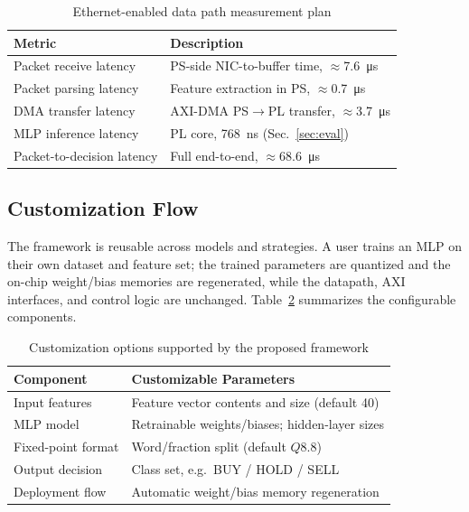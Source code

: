 \documentclass[final,5p,times,twocolumn]{elsarticle}
\begin{document}
\begin{table}[htbp]
\centering
\caption{Ethernet-enabled data path measurement plan}
\label{tab:ethernet_measurement_plan}
\begin{tabular}{p{3.2cm} p{4.2cm}}
\toprule
Metric & Description \\
\midrule
Packet receive latency & PS-side NIC-to-buffer time, $\approx$\SI{7.6}{\micro\second} \\
Packet parsing latency & Feature extraction in PS, $\approx$\SI{0.7}{\micro\second} \\
DMA transfer latency & AXI-DMA PS$\rightarrow$PL transfer, $\approx$\SI{3.7}{\micro\second} \\
MLP inference latency & PL core, \SI{768}{\nano\second} (Sec.~\ref{sec:eval}) \\
Packet-to-decision latency & Full end-to-end, $\approx$\SI{68.6}{\micro\second} \\
\bottomrule
\end{tabular}
\end{table}

\subsection{Customization Flow}
The framework is reusable across models and strategies. A user trains an MLP on
their own dataset and feature set; the trained parameters are quantized and the
on-chip weight/bias memories are regenerated, while the datapath, AXI
interfaces, and control logic are unchanged. Table~\ref{tab:customization_options}
summarizes the configurable components.

\begin{table}[htbp]
\centering
\caption{Customization options supported by the proposed framework}
\label{tab:customization_options}
\begin{tabular}{p{3.0cm} p{4.4cm}}
\toprule
Component & Customizable Parameters \\
\midrule
Input features & Feature vector contents and size (default 40) \\
MLP model & Retrainable weights/biases; hidden-layer sizes \\
Fixed-point format & Word/fraction split (default $Q8.8$) \\
Output decision & Class set, e.g.\ BUY / HOLD / SELL \\
Deployment flow & Automatic weight/bias memory regeneration \\
\bottomrule
\end{tabular}
\end{table}
\end{document}
